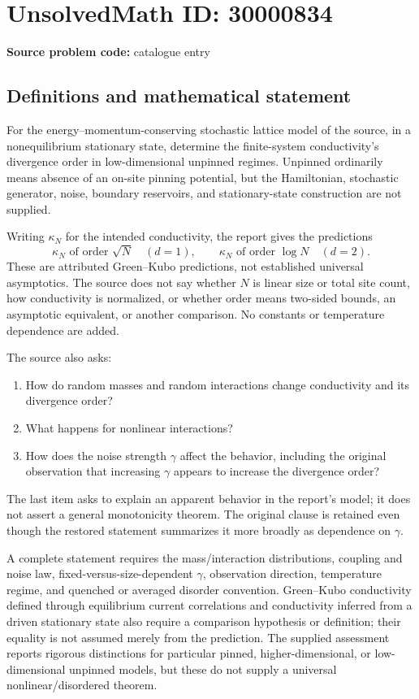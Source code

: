\documentclass[11pt]{article}
\begin{document}
\section*{UnsolvedMath ID: 30000834}
\textbf{Source problem code:} catalogue entry
\subsection{Definitions and mathematical statement}
For the energy--momentum-conserving stochastic lattice model of the source, in a nonequilibrium stationary state, determine the finite-system conductivity's divergence order in low-dimensional unpinned regimes. Unpinned ordinarily means absence of an on-site pinning potential, but the Hamiltonian, stochastic generator, noise, boundary reservoirs, and stationary-state construction are not supplied.

Writing $\kappa_N$ for the intended conductivity, the report gives the predictions
\[
 \kappa_N\text{ of order }\sqrt N\quad(d=1),\qquad
 \kappa_N\text{ of order }\log N\quad(d=2).
\]
These are attributed Green--Kubo predictions, not established universal asymptotics. The source does not say whether $N$ is linear size or total site count, how conductivity is normalized, or whether order means two-sided bounds, an asymptotic equivalent, or another comparison. No constants or temperature dependence are added.

The source also asks:
\begin{enumerate}
\item How do random masses and random interactions change conductivity and its divergence order?
\item What happens for nonlinear interactions?
\item How does the noise strength $\gamma$ affect the behavior, including the original observation that increasing $\gamma$ appears to increase the divergence order?
\end{enumerate}
The last item asks to explain an apparent behavior in the report's model; it does not assert a general monotonicity theorem. The original clause is retained even though the restored statement summarizes it more broadly as dependence on $\gamma$.

A complete statement requires the mass/interaction distributions, coupling and noise law, fixed-versus-size-dependent $\gamma$, observation direction, temperature regime, and quenched or averaged disorder convention. Green--Kubo conductivity defined through equilibrium current correlations and conductivity inferred from a driven stationary state also require a comparison hypothesis or definition; their equality is not assumed merely from the prediction. The supplied assessment reports rigorous distinctions for particular pinned, higher-dimensional, or low-dimensional unpinned models, but these do not supply a universal nonlinear/disordered theorem.
\end{document}
